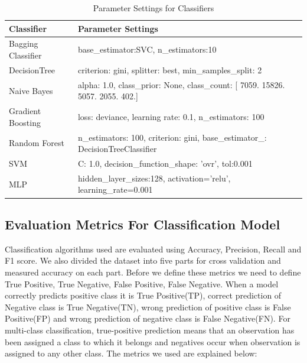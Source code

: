 \begin{table}[H]
    \centering
    \begin{tabular}{|l|l|}
    \hline
        \textbf{Classifier} & \textbf{Parameter Settings} \\ \hline
        Bagging Classifier & base\_estimator:SVC, n\_estimators:10 \\ \hline
        DecisionTree & criterion: gini, splitter: best, min\_samples\_split: 2 \\ \hline
        Naive Bayes & alpha: 1.0, class\_prior: None, class\_count: [ 7059. 15826.  5057.  2055.   402.] \\ \hline
        Gradient Boosting & loss: deviance, learning rate: 0.1, n\_estimators: 100 \\ \hline
        Random Forest & n\_estimators: 100, criterion: gini, base\_estimator\_: DecisionTreeClassifier \\ \hline
        SVM & C: 1.0, decision\_function\_shape: 'ovr', tol:0.001 \\ \hline
        MLP & hidden\_layer\_sizes:128, activation='relu', learning\_rate=0.001 \\ \hline
    \end{tabular}
    \caption{Parameter Settings for Classifiers}
    \label{table:parametersClassifiers}
\end{table}

\subsection{Evaluation Metrics For Classification Model}
\label{subsection:evaluationMetrics}
Classification algorithms used are evaluated using Accuracy, Precision, Recall and F1 score. We also divided the dataset into five parts for cross validation and measured accuracy on each part. Before we define these metrics we need to define True Positive, True Negative, False Positive, False Negative. When a model correctly predicts positive class it is True Positive(TP), correct prediction of Negative class is True Negative(TN), wrong prediction of positive class is False Positive(FP) and wrong prediction of negative class is False Negative(FN). For multi-class classification, true-positive prediction means that an  observation has been assigned a class to which it belongs and negatives occur when observation is assigned to any other class.  The metrics we used are explained below:

